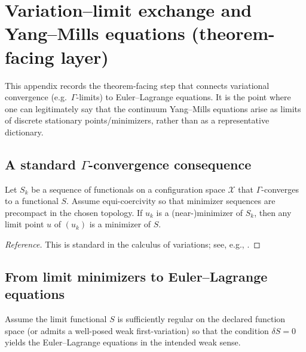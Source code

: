 \section{Variation--limit exchange and Yang--Mills equations (theorem-facing layer)}
\label{app:variation_limit_exchange_and_yang_mills_eom}

This appendix records the theorem-facing step that connects variational convergence (e.g.\ $\Gamma$-limits) to Euler--Lagrange equations.
It is the point where one can legitimately say that the continuum Yang--Mills equations arise as limits of discrete stationary points/minimizers, rather than as a representative dictionary.

\subsection{A standard $\Gamma$-convergence consequence}
\begin{theorem}
\label{thm:gamma_convergence_minimizers_template}
\MathTag Let $S_k$ be a sequence of functionals on a configuration space $\mathcal{X}$ that $\Gamma$-converges to a functional $S$.
Assume equi-coercivity so that minimizer sequences are precompact in the chosen topology.
If $u_k$ is a (near-)minimizer of $S_k$, then any limit point $u$ of $(u_k)$ is a minimizer of $S$.
\end{theorem}

\begin{proof}[Reference]
This is standard in the calculus of variations; see, e.g., \cite{DalMaso1993GammaConvergence}.
\end{proof}

\subsection{From limit minimizers to Euler--Lagrange equations}
\begin{assumption}
\label{ass:weak_el_bundle}
\MathTag Assume the limit functional $S$ is sufficiently regular on the declared function space (or admits a well-posed weak first-variation) so that the condition $\delta S=0$ yields the Euler--Lagrange equations in the intended weak sense.
\end{assumption}

